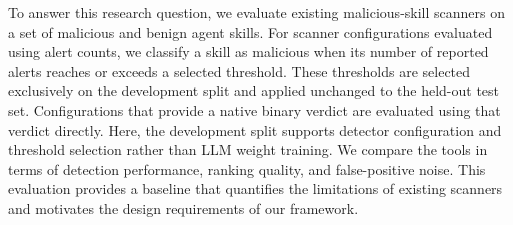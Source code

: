 To answer this research question, we evaluate existing malicious-skill scanners on a set of malicious and benign agent skills. 
For scanner configurations evaluated using alert counts,
we classify a skill as malicious when its number of reported
alerts reaches or exceeds a selected threshold. These thresholds
are selected exclusively on the development split and applied
unchanged to the held-out test set. Configurations that provide
a native binary verdict are evaluated using that verdict directly.
Here, the development split supports detector configuration
and threshold selection rather than LLM weight training.
We compare the tools in terms of detection performance, ranking quality, and false-positive noise. This evaluation provides a baseline that quantifies the limitations of existing scanners and motivates the design requirements of our framework.


